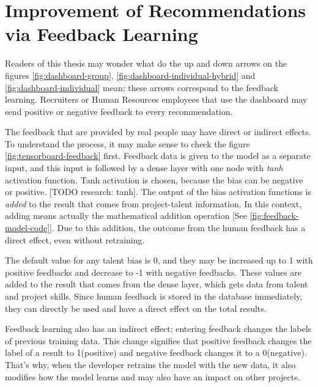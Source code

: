 \section{Improvement of Recommendations via Feedback Learning}\label{section:feedback-learning}

Readers of this thesis may wonder what do the up and down arrows on the figures \ref{fig:dashboard-group}, \ref{fig:dashboard-individual-hybrid} and \ref{fig:dashboard-individual} mean; these arrows correspond to the feedback learning. Recruiters or Human Resources employees that use the dashboard may send positive or negative feedback to every recommendation. 

The feedback that are provided by real people may have direct or indirect effects. To understand the process, it may make sense to check the figure \ref{fig:tensorboard-feedback} first. Feedback data is given to the model as a separate input, and this input is followed by a dense layer with one node with \textit{tanh} activation function. Tanh activation is chosen, because the bias can be negative or positive. [TODO research: tanh]. The output of the bias activation functions is \textit{added} to the result that comes from project-talent information. In this context, adding means actually the mathematical addition operation [See \ref{fig:feedback-model-code}]. Due to this addition, the outcome from the human feedback has a direct effect, even without retraining. 

The default value for any talent bias is 0, and they may be increased up to 1 with positive feedbacks and decrease to -1 with negative feedbacks. These values are added to the result that comes from the dense layer, which gets data from talent and project skills. Since human feedback is stored in the database immediately, they can directly be used and have a direct effect on the total results.


Feedback learning also has an indirect effect;  entering feedback changes the labels of previous training data. This change signifies that positive feedback changes the label of a result to 1(positive) and negative feedback changes it to a 0(negative). That's why, when the developer retrains the model with the new data, it also modifies how the model learns and may also have an impact on other projects.


